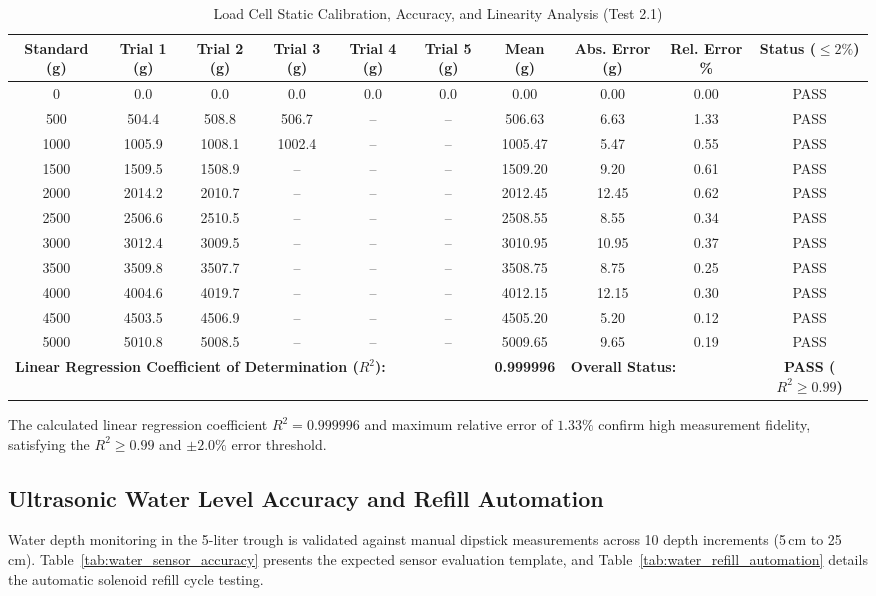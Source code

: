 \begin{table}[htbp!]
\centering
\caption{Load Cell Static Calibration, Accuracy, and Linearity Analysis (Test 2.1)}
\label{tab:load_cell_calibration}
\begin{adjustbox}{width=\textwidth}
\begin{tabular}{cccccccccc}
\toprule
\textbf{Standard (g)} & \textbf{Trial 1 (g)} & \textbf{Trial 2 (g)} & \textbf{Trial 3 (g)} & \textbf{Trial 4 (g)} & \textbf{Trial 5 (g)} & \textbf{Mean (g)} & \textbf{Abs. Error (g)} & \textbf{Rel. Error \%} & \textbf{Status ($\le 2\%$)} \\
\midrule
0 & 0.0 & 0.0 & 0.0 & 0.0 & 0.0 & 0.00 & 0.00 & 0.00 & PASS \\
500 & 504.4 & 508.8 & 506.7 & -- & -- & 506.63 & 6.63 & 1.33 & PASS \\
1000 & 1005.9 & 1008.1 & 1002.4 & -- & -- & 1005.47 & 5.47 & 0.55 & PASS \\
1500 & 1509.5 & 1508.9 & -- & -- & -- & 1509.20 & 9.20 & 0.61 & PASS \\
2000 & 2014.2 & 2010.7 & -- & -- & -- & 2012.45 & 12.45 & 0.62 & PASS \\
2500 & 2506.6 & 2510.5 & -- & -- & -- & 2508.55 & 8.55 & 0.34 & PASS \\
3000 & 3012.4 & 3009.5 & -- & -- & -- & 3010.95 & 10.95 & 0.37 & PASS \\
3500 & 3509.8 & 3507.7 & -- & -- & -- & 3508.75 & 8.75 & 0.25 & PASS \\
4000 & 4004.6 & 4019.7 & -- & -- & -- & 4012.15 & 12.15 & 0.30 & PASS \\
4500 & 4503.5 & 4506.9 & -- & -- & -- & 4505.20 & 5.20 & 0.12 & PASS \\
5000 & 5010.8 & 5008.5 & -- & -- & -- & 5009.65 & 9.65 & 0.19 & PASS \\
\midrule
\multicolumn{6}{l}{\textbf{Linear Regression Coefficient of Determination ($R^2$):}} & \textbf{0.999996} & \multicolumn{2}{l}{\textbf{Overall Status:}} & \textbf{PASS ($R^2 \ge 0.99$)} \\
\bottomrule
\end{tabular}
\end{adjustbox}
\end{table}

The calculated linear regression coefficient $R^2 = 0.999996$ and maximum relative error of $1.33\%$ confirm high measurement fidelity, satisfying the $R^2 \ge 0.99$ and $\pm 2.0\%$ error threshold.

\subsection{Ultrasonic Water Level Accuracy and Refill Automation}
Water depth monitoring in the 5-liter trough is validated against manual dipstick measurements across 10 depth increments (5\,cm to 25\,cm). Table~\ref{tab:water_sensor_accuracy} presents the expected sensor evaluation template, and Table~\ref{tab:water_refill_automation} details the automatic solenoid refill cycle testing.

